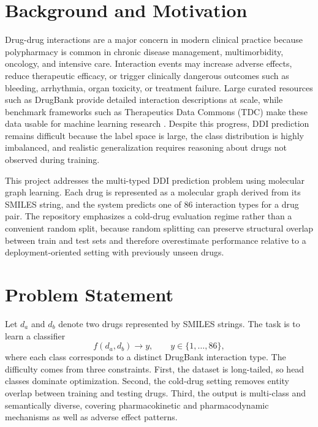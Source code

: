 \documentclass[12pt,a4paper]{report}
\begin{document}
\section{Background and Motivation}
Drug-drug interactions are a major concern in modern clinical practice because polypharmacy is common in chronic disease management, multimorbidity, oncology, and intensive care. Interaction events may increase adverse effects, reduce therapeutic efficacy, or trigger clinically dangerous outcomes such as bleeding, arrhythmia, organ toxicity, or treatment failure. Large curated resources such as DrugBank provide detailed interaction descriptions at scale, while benchmark frameworks such as Therapeutics Data Commons (TDC) make these data usable for machine learning research \cite{wishart2018drugbank, huang2021tdc}. Despite this progress, DDI prediction remains difficult because the label space is large, the class distribution is highly imbalanced, and realistic generalization requires reasoning about drugs not observed during training.

This project addresses the multi-typed DDI prediction problem using molecular graph learning. Each drug is represented as a molecular graph derived from its SMILES string, and the system predicts one of 86 interaction types for a drug pair. The repository emphasizes a cold-drug evaluation regime rather than a convenient random split, because random splitting can preserve structural overlap between train and test sets and therefore overestimate performance relative to a deployment-oriented setting with previously unseen drugs.

\section{Problem Statement}
Let \(d_a\) and \(d_b\) denote two drugs represented by SMILES strings. The task is to learn a classifier
\begin{equation}
f(d_a, d_b) \rightarrow y, \qquad y \in \{1, \dots, 86\},
\end{equation}
where each class corresponds to a distinct DrugBank interaction type. The difficulty comes from three constraints. First, the dataset is long-tailed, so head classes dominate optimization. Second, the cold-drug setting removes entity overlap between training and testing drugs. Third, the output is multi-class and semantically diverse, covering pharmacokinetic and pharmacodynamic mechanisms as well as adverse effect patterns.
\end{document}
